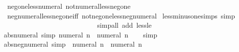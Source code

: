 \begin{isabellebody}
\ \ neg{\isacharunderscore}{\kern0pt}one{\isacharunderscore}{\kern0pt}less{\isacharunderscore}{\kern0pt}numeral\ not{\isacharunderscore}{\kern0pt}numeral{\isacharunderscore}{\kern0pt}less{\isacharunderscore}{\kern0pt}neg{\isacharunderscore}{\kern0pt}one\isanewline
\ \ neg{\isacharunderscore}{\kern0pt}numeral{\isacharunderscore}{\kern0pt}less{\isacharunderscore}{\kern0pt}neg{\isacharunderscore}{\kern0pt}one{\isacharunderscore}{\kern0pt}iff\ not{\isacharunderscore}{\kern0pt}neg{\isacharunderscore}{\kern0pt}one{\isacharunderscore}{\kern0pt}less{\isacharunderscore}{\kern0pt}neg{\isacharunderscore}{\kern0pt}numeral\isanewline
\isanewline
{}\isamarkupfalse%
\ less{\isacharunderscore}{\kern0pt}minus{\isacharunderscore}{\kern0pt}one{\isacharunderscore}{\kern0pt}simps\ {\isacharbrackleft}{\kern0pt}simp{\isacharbrackright}{\kern0pt}{\isacharcolon}{\kern0pt}\isanewline
\ \ {\isachardoublequoteopen}{\isacharminus}{\kern0pt}\ {}\ {\isacharless}{\kern0pt}\ {}{\isachardoublequoteclose}\isanewline
\ \ {\isachardoublequoteopen}{\isacharminus}{\kern0pt}\ {}\ {\isacharless}{\kern0pt}\ {}{\isachardoublequoteclose}\isanewline
\ \ {\isachardoublequoteopen}{\isasymnot}\ {}\ {\isacharless}{\kern0pt}\ {\isacharminus}{\kern0pt}\ {}{\isachardoublequoteclose}\isanewline
\ \ {\isachardoublequoteopen}{\isasymnot}\ {}\ {\isacharless}{\kern0pt}\ {\isacharminus}{\kern0pt}\ {}{\isachardoublequoteclose}\isanewline
%
\isadelimproof
\ \ %
\endisadelimproof
%
\isatagproof
{}\isamarkupfalse%
\ {\isacharparenleft}{\kern0pt}simp{\isacharunderscore}{\kern0pt}all\ add{\isacharcolon}{\kern0pt}\ less{\isacharunderscore}{\kern0pt}le{\isacharparenright}{\kern0pt}%
\endisatagproof
{\isafoldproof}%
%
\isadelimproof
\isanewline
%
\endisadelimproof
\isanewline
{}\isamarkupfalse%
\ abs{\isacharunderscore}{\kern0pt}numeral\ {\isacharbrackleft}{\kern0pt}simp{\isacharbrackright}{\kern0pt}{\isacharcolon}{\kern0pt}\ {\isachardoublequoteopen}{\isasymbar}numeral\ n{\isasymbar}\ {\isacharequal}{\kern0pt}\ numeral\ n{\isachardoublequoteclose}\isanewline
%
\isadelimproof
\ \ %
\endisadelimproof
%
\isatagproof
{}\isamarkupfalse%
\ simp%
\endisatagproof
{\isafoldproof}%
%
\isadelimproof
\isanewline
%
\endisadelimproof
\isanewline
{}\isamarkupfalse%
\ abs{\isacharunderscore}{\kern0pt}neg{\isacharunderscore}{\kern0pt}numeral\ {\isacharbrackleft}{\kern0pt}simp{\isacharbrackright}{\kern0pt}{\isacharcolon}{\kern0pt}\ {\isachardoublequoteopen}{\isasymbar}{\isacharminus}{\kern0pt}\ numeral\ n{\isasymbar}\ {\isacharequal}{\kern0pt}\ numeral\ n{\isachardoublequoteclose}\isanewline

\end{isabellebody}
